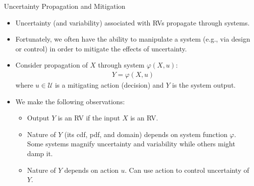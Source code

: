 \documentclass[handout,9pt]{beamer}
\begin{document}
%
\begin{frame}{Uncertainty Propagation and Mitigation}
\begin{itemize}
 \setlength{\itemsep}{10pt}
\item Uncertainty (and variability) associated with RVs propagate through systems. 

\item Fortunately, we often have the ability to manipulate a system (e.g., via design or control) in order to mitigate the effects of uncertainty. 

\item Consider propagation of $X$ through system $\varphi(X,u)$:
\begin{align*}
Y=\varphi(X,u)
\end{align*}
where $u\in \mathcal{U}$ is a mitigating action (decision) and $Y$ is the system output. 
\item We make the following observations:
\begin{block}{}
\begin{itemize}
 \setlength{\itemsep}{5pt}
\item Output $Y$ is an RV if the input $X$ is an RV.
\item Nature of $Y$ (its cdf, pdf, and domain) depends on system function $\varphi$. Some systems magnify uncertainty and variability while others might damp it. 
\item Nature of $Y$ depends on action $u$.  Can use action to control uncertainty of $Y$.  
\end{itemize}
\end{block}
\end{itemize}

\end{frame}
\end{document}
